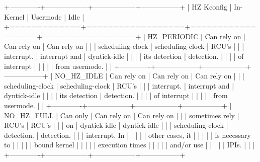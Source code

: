 \begin{VerbatimU}
+-------------+------------------+------------------+-----------------+
| HZ Kconfig  | In-Kernel        | Usermode         | Idle            |
+=============+==================+==================+=================+
| HZ_PERIODIC | Can rely on      | Can rely on      | Can rely on     |
|             | scheduling-clock | scheduling-clock | RCU's           |
|             | interrupt.       | interrupt and    | dyntick-idle    |
|             |                  | its detection    | detection.      |
|             |                  | of interrupt     |                 |
|             |                  | from usermode.   |                 |
+-------------+------------------+------------------+-----------------+
| NO_HZ_IDLE  | Can rely on      | Can rely on      | Can rely on     |
|             | scheduling-clock | scheduling-clock | RCU's           |
|             | interrupt.       | interrupt and    | dyntick-idle    |
|             |                  | its detection    | detection.      |
|             |                  | of interrupt     |                 |
|             |                  | from usermode.   |                 |
+-------------+------------------+------------------+-----------------+
| NO_HZ_FULL  | Can only         | Can rely on      | Can rely on     |
|             | sometimes rely   | RCU's            | RCU's           |
|             | on               | dyntick-idle     | dyntick-idle    |
|             | scheduling-clock | detection.       | detection.      |
|             | interrupt. In    |                  |                 |
|             | other cases, it  |                  |                 |
|             | is necessary to  |                  |                 |
|             | bound kernel     |                  |                 |
|             | execution times  |                  |                 |
|             | and/or use       |                  |                 |
|             | IPIs.            |                  |                 |
+-------------+------------------+------------------+-----------------+
\end{VerbatimU}

\QuickQuizEnd

